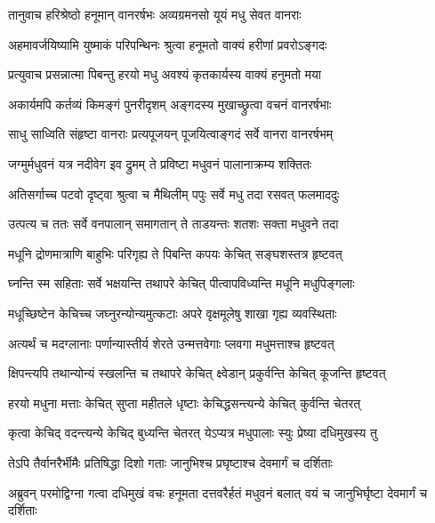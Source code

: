 
\twolineshloka
{तानुवाच हरिश्रेष्ठो हनूमान् वानरर्षभः}
{अव्यग्रमनसो यूयं मधु सेवत वानराः} %

\twolineshloka
{अहमावर्जयिष्यामि युष्माकं परिपन्थिनः}
{श्रुत्वा हनूमतो वाक्यं हरीणां प्रवरोऽङ्गदः} %

\twolineshloka
{प्रत्युवाच प्रसन्नात्मा पिबन्तु हरयो मधु}
{अवश्यं कृतकार्यस्य वाक्यं हनुमतो मया} %

\twolineshloka
{अकार्यमपि कर्तव्यं किमङ्गं पुनरीदृशम्}
{अङ्गदस्य मुखाच्छ्रुत्वा वचनं वानरर्षभाः} %

\twolineshloka
{साधु साध्विति संहृष्टा वानराः प्रत्यपूजयन्}
{पूजयित्वाङ्गदं सर्वे वानरा वानरर्षभम्} %

\twolineshloka
{जग्मुर्मधुवनं यत्र नदीवेग इव द्रुमम्}
{ते प्रविष्टा मधुवनं पालानाक्रम्य शक्तितः} %

\twolineshloka
{अतिसर्गाच्च पटवो दृष्ट्वा श्रुत्वा च मैथिलीम्}
{पपुः सर्वे मधु तदा रसवत् फलमाददुः} %

\twolineshloka
{उत्पत्य च ततः सर्वे वनपालान् समागतान्}
{ते ताडयन्तः शतशः सक्ता मधुवने तदा} %

\twolineshloka
{मधूनि द्रोणमात्राणि बाहुभिः परिगृह्य ते}
{पिबन्ति कपयः केचित् सङ्घशस्तत्र हृष्टवत्} %

\twolineshloka
{घ्नन्ति स्म सहिताः सर्वे भक्षयन्ति तथापरे}
{केचित् पीत्वापविध्यन्ति मधूनि मधुपिङ्गलाः} %

\twolineshloka
{मधूच्छिष्टेन केचिच्च जघ्नुरन्योन्यमुत्कटाः}
{अपरे वृक्षमूलेषु शाखा गृह्य व्यवस्थिताः} %

\twolineshloka
{अत्यर्थं च मदग्लानाः पर्णान्यास्तीर्य शेरते}
{उन्मत्तवेगाः प्लवगा मधुमत्ताश्च हृष्टवत्} %

\twolineshloka
{क्षिपन्त्यपि तथान्योन्यं स्खलन्ति च तथापरे}
{केचित् क्ष्वेडान् प्रकुर्वन्ति केचित् कूजन्ति हृष्टवत्} %

\twolineshloka
{हरयो मधुना मत्ताः केचित् सुप्ता महीतले}
{धृष्टाः केचिद्धसन्त्यन्ये केचित् कुर्वन्ति चेतरत्} %

\twolineshloka
{कृत्वा केचिद् वदन्त्यन्ये केचिद् बुध्यन्ति चेतरत्}
{येऽप्यत्र मधुपालाः स्युः प्रेष्या दधिमुखस्य तु} %

\twolineshloka
{तेऽपि तैर्वानरैर्भीमैः प्रतिषिद्धा दिशो गताः}
{जानुभिश्च प्रघृष्टाश्च देवमार्गं च दर्शिताः} %

\threelineshloka
{अब्रुवन् परमोद्विग्ना गत्वा दधिमुखं वचः}
{हनूमता दत्तवरैर्हतं मधुवनं बलात्}
{वयं च जानुभिर्घृष्टा देवमार्गं च दर्शिताः} %

